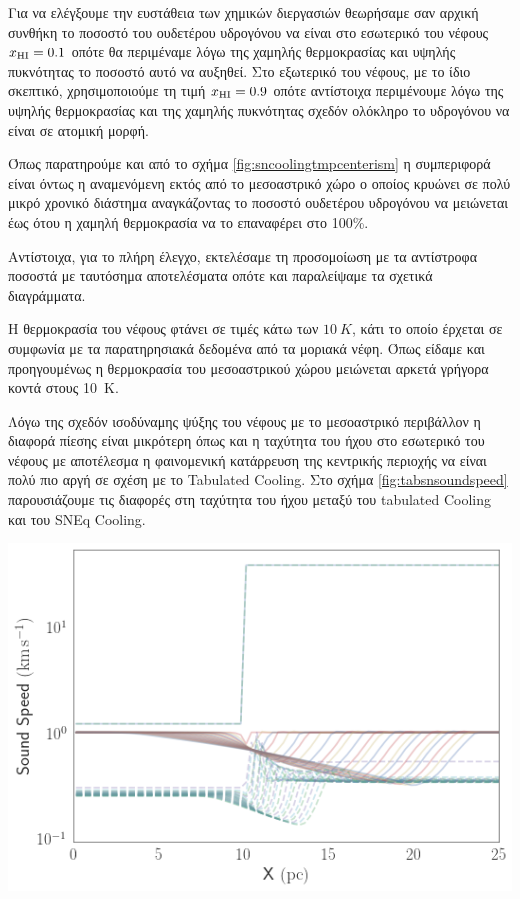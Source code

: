 	Για να ελέγξουμε την ευστάθεια των χημικών διεργασιών θεωρήσαμε σαν αρχική συνθήκη το ποσοστό του ουδετέρου υδρογόνου να είναι στο εσωτερικό του νέφους $x_{\ce{HI}}=0.1$ οπότε θα περιμέναμε λόγω της χαμηλής θερμοκρασίας και υψηλής πυκνότητας το ποσοστό αυτό να αυξηθεί. Στο εξωτερικό του νέφους, με το ίδιο σκεπτικό, χρησιμοποιούμε τη τιμή $x_{\ce{HI}}=0.9$ οπότε αντίστοιχα περιμένουμε λόγω της υψηλής θερμοκρασίας και της χαμηλής πυκνότητας σχεδόν ολόκληρο το υδρογόνου να είναι σε ατομική μορφή. 
	
	Όπως παρατηρούμε και από το σχήμα \ref{fig:sncoolingtmpcenterism} η συμπεριφορά είναι όντως η αναμενόμενη εκτός από το μεσοαστρικό χώρο ο οποίος κρυώνει σε πολύ μικρό χρονικό διάστημα αναγκάζοντας το ποσοστό ουδετέρου υδρογόνου να μειώνεται έως ότου η χαμηλή θερμοκρασία να το επαναφέρει στο 100\%. 
	
	Αντίστοιχα, για το πλήρη έλεγχο, εκτελέσαμε τη προσομοίωση με τα αντίστροφα ποσοστά με ταυτόσημα αποτελέσματα οπότε και παραλείψαμε τα σχετικά διαγράμματα.


Η θερμοκρασία του νέφους φτάνει σε τιμές κάτω των $\SI{10}{K}$, κάτι το οποίο έρχεται σε συμφωνία με τα  παρατηρησιακά δεδομένα από τα μοριακά νέφη. Όπως είδαμε και προηγουμένως η θερμοκρασία του μεσοαστρικού χώρου μειώνεται αρκετά γρήγορα κοντά στους \SI{10}{K}.


Λόγω της σχεδόν ισοδύναμης ψύξης του νέφους με το μεσοαστρικό περιβάλλον η διαφορά πίεσης είναι μικρότερη όπως και η ταχύτητα του ήχου στο εσωτερικό του νέφους με αποτέλεσμα η φαινομενική κατάρρευση της κεντρικής περιοχής να είναι πολύ πιο αργή σε σχέση με το Tabulated Cooling. Στο σχήμα \ref{fig:tabsnsoundspeed} παρουσιάζουμε τις διαφορές στη ταχύτητα του ήχου μεταξύ του tabulated Cooling και του SNEq Cooling.

\begin{marginfigure}
	\centering
	\includegraphics[width=1\linewidth]{DataImages/TabSNSoundSpeed}
	\caption{}
	\label{fig:tabsnsoundspeed}
\end{marginfigure}

